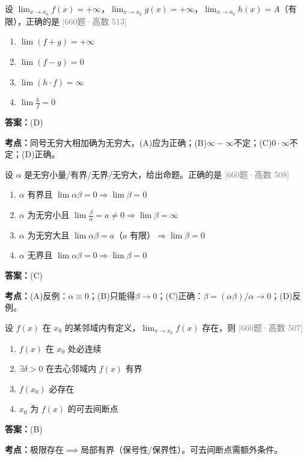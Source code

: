 \documentclass[12pt,a4paper]{ctexbook}
\newcommand{\src}[1]{\hfill\textcolor{gray}{\small\textsf{[#1]}}}
\newcommand{\ans}[1]{\begin{answerbox}\textbf{答案：}#1\end{answerbox}}
\newcommand{\kpt}[1]{\textbf{考点：}#1}
\begin{document}
\bigskip

\begin{exercise}[660题·无穷大运算]
设 $\lim_{x\to x_0}f(x)=+\infty$，$\lim_{x\to x_0}g(x)=+\infty$，$\lim_{x\to x_0}h(x)=A$（有限），正确的是 \hfill\src{660题·高数 513}
\begin{enumerate}[label=(\Alph*),nosep]
  \item $\lim(f+g)=+\infty$
  \item $\lim(f-g)=0$
  \item $\lim(h\cdot f)=\infty$
  \item $\lim\frac{h}{f}=0$
\end{enumerate}
\end{exercise}
\ans{(D)}
\kpt{同号无穷大相加确为无穷大，(A)应为正确；(B)$\infty-\infty$不定；(C)$0\cdot\infty$不定；(D)正确。}

\bigskip

\begin{exercise}
设 $\alpha$ 是无穷小量/有界/无界/无穷大，给出命题。正确的是 \hfill\src{660题·高数 508}
\begin{enumerate}[label=(\Alph*),nosep]
  \item $\alpha$ 有界且 $\lim\alpha\beta=0 \Rightarrow \lim\beta=0$
  \item $\alpha$ 为无穷小且 $\lim\frac{\beta}{\alpha}=a\neq 0 \Rightarrow \lim\beta=\infty$
  \item $\alpha$ 为无穷大且 $\lim\alpha\beta=a$（$a$ 有限）$\Rightarrow \lim\beta=0$
  \item $\alpha$ 无界且 $\lim\alpha\beta=0 \Rightarrow \lim\beta=0$
\end{enumerate}
\end{exercise}
\ans{(C)}
\kpt{(A)反例：$\alpha\equiv 0$；(B)只能得$\beta\to 0$；(C)正确：$\beta=(\alpha\beta)/\alpha\to 0$；(D)反例。}

\bigskip

\begin{exercise}[660题·极限存在性]
设 $f(x)$ 在 $x_0$ 的某邻域内有定义，$\lim_{x\to x_0}f(x)$ 存在，则 \hfill\src{660题·高数 507}
\begin{enumerate}[label=(\Alph*),nosep]
  \item $f(x)$ 在 $x_0$ 处必连续
  \item $\exists\delta>0$ 在去心邻域内 $f(x)$ 有界
  \item $f(x_0)$ 必存在
  \item $x_0$ 为 $f(x)$ 的可去间断点
\end{enumerate}
\end{exercise}
\ans{(B)}
\kpt{极限存在$\implies$局部有界（保号性/保界性）。可去间断点需额外条件。}
\end{document}
